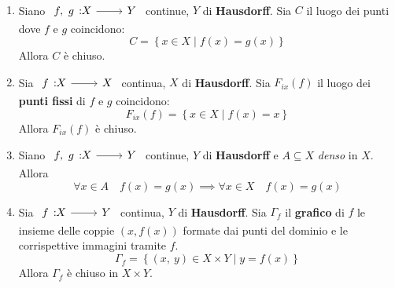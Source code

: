 \begin{proposition}~{}
\begin{enumerate}
\item Siano $\funz{f,\ g}{X}{Y}$ continue, $Y$ di \textbf{Hausdorff}. Sia $C$ il luogo dei punti dove $f$ e $g$ coincidono:
\begin{equation}
C=\left\{x\in X\mid f\left(x\right)=g\left(x\right)\right\}
\end{equation}
Allora $C$ è chiuso.
\item  Sia $\funz{f}{X}{X}$ continua, $X$ di \textbf{Hausdorff}.  Sia $F_{ix}\left(f\right)$ il luogo dei \textbf{punti fissi} di $f$ e $g$ coincidono:
\begin{equation}
F_{ix}\left(f\right)=\left\{x\in X\mid f\left(x\right)=x\right\}
\end{equation}
Allora $F_{ix}\left(f\right)$ è chiuso.
\item Siano $\funz{f,\ g}{X}{Y}$ continue, $Y$ di \textbf{Hausdorff} e $A\subseteq X$ \textit{denso} in $X$. Allora
\begin{equation}
\forall x\in A\quad f\left(x\right)=g\left(x\right)\implies \forall x\in X\quad f\left(x\right)=g\left(x\right)
\end{equation}
\item Sia $\funz{f}{X}{Y}$ continua, $Y$ di \textbf{Hausdorff}. Sia $\Gamma_f$ il \textbf{grafico} di $f$ le insieme delle coppie $(x,f\left(x\right))$ formate dai punti del dominio e le corrispettive immagini tramite $f$.
\begin{equation}
\Gamma_f=\left\{\left(x,\ y\right)\in X\times Y\mid y=f\left(x\right)\right\}
\end{equation}
Allora $\Gamma_f$ è chiuso in $X\times Y$.
\end{enumerate}
\vspace{-3mm}
\end{proposition}
